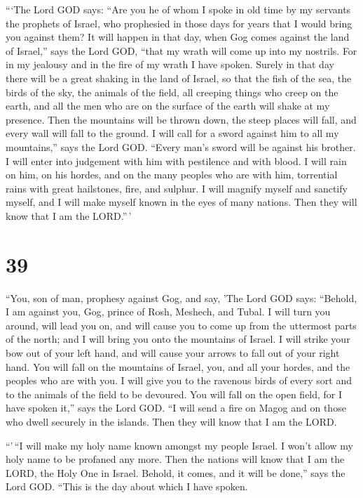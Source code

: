  ```The Lord GOD says: ``Are you he of whom I spoke in
old time by my servants the prophets of Israel, who prophesied in those
days for years that I would bring you against them?  It
will happen in that day, when Gog comes against the land of Israel,''
says the Lord GOD, ``that my wrath will come up into my nostrils.
 For in my jealousy and in the fire of my wrath I have
spoken. Surely in that day there will be a great shaking in the land of
Israel,  so that the fish of the sea, the birds of the
sky, the animals of the field, all creeping things who creep on the
earth, and all the men who are on the surface of the earth will shake at
my presence. Then the mountains will be thrown down, the steep places
will fall, and every wall will fall to the ground.  I
will call for a sword against him to all my mountains,'' says the Lord
GOD. ``Every man's sword will be against his brother.  I
will enter into judgement with him with pestilence and with blood. I
will rain on him, on his hordes, and on the many peoples who are with
him, torrential rains with great hailstones, fire, and sulphur.
 I will magnify myself and sanctify myself, and I will
make myself known in the eyes of many nations. Then they will know that
I am the LORD.''\,'

\hypertarget{section-37}{%
\section{39}\label{section-37}}

 ``You, son of man, prophesy against Gog, and say, 'The
Lord GOD says: ``Behold, I am against you, Gog, prince of Rosh, Meshech,
and Tubal.  I will turn you around, will lead you on, and
will cause you to come up from the uttermost parts of the north; and I
will bring you onto the mountains of Israel.  I will
strike your bow out of your left hand, and will cause your arrows to
fall out of your right hand.  You will fall on the
mountains of Israel, you, and all your hordes, and the peoples who are
with you. I will give you to the ravenous birds of every sort and to the
animals of the field to be devoured.  You will fall on the
open field, for I have spoken it,'' says the Lord GOD. 
``I will send a fire on Magog and on those who dwell securely in the
islands. Then they will know that I am the LORD.

 ``'\,``I will make my holy name known amongst my people
Israel. I won't allow my holy name to be profaned any more. Then the
nations will know that I am the LORD, the Holy One in Israel.
 Behold, it comes, and it will be done,'' says the Lord
GOD. ``This is the day about which I have spoken.

